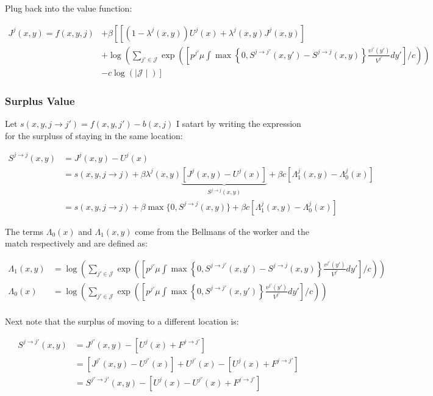 \documentclass[
  letterpaper,
  DIV=11,
  numbers=noendperiod]{scrartcl}
\begin{document}
Plug back into the value function:

\begin{align*}
J^j(x,y) = f(x,y,j) & + \beta\left [ \left[  (1-\lambda^j(x,y))U^{j}(x)   +\lambda^j(x,y)J^j(x,y) \right] \right. \\ & \left. +\log\left(\sum_{j'\in \mathcal{J}}\exp{\left(\left[p^{j'} \mu \int \max\left\{0, S^{j\to j' }(x,y')-S^{j \to j}(x,y) \right\}\frac{v^{ j' }(y')}{V^{j'}}dy' \right] / c\right)} \right) \right. \\ & \left.- c \log(\mid\mathcal{J}\mid)\right]
\end{align*}

\hypertarget{surplus-value}{%
\subsubsection{Surplus Value}\label{surplus-value}}

Let \(s(x,y, j \to j') = f(x,y,j') - b(x,j)\) I satart by writing the
expression for the surpluss of staying in the same location:

\begin{align*}
S^{j \to j}(x,y) &= J^j(x, y) - U^{j}(x) \\
& = s(x,y,j \to j) + \beta \lambda^j(x,y)\underbrace{\left[J^j(x,y) - U^j(x)\right]}_{S^{j\to j}(x,y)} + \beta c \left[ \Lambda^j_1(x, y) - \Lambda^j_0(x)\right]\\
& = s(x,y,j \to j) + \beta \max\{0, S^{j\to j}(x,y)\} + \beta c \left[ \Lambda^j_1(x, y) - \Lambda^j_0(x)\right]
\end{align*}

The terms \(\Lambda_0(x)\) and \(\Lambda_1(x,y)\) come from the Bellmans
of the worker and the match respectively and are defined as:

\begin{align*}
\Lambda_1(x, y) &= \log \left(\sum_{j'\in \mathcal{J}}\exp{\left(\left[p^{j'} \mu \int \max\left\{0, S^{j\to j' }(x,y')-S^{j \to j}(x,y) \right\}\frac{v^{ j' }(y')}{V^{j'}}dy' \right] / c\right)} \right) \\
\Lambda_0(x) &= \log \left(\sum_{j'\in \mathcal{J}}\exp{\left(\left[p^{j'} \mu \int \max\left\{0, S^{j\to j' }(x,y') \right\}\frac{v^{ j' }(y')}{V^{j'}}dy' \right] / c\right)}\right) \\
\end{align*}

Next note that the surplus of moving to a different location is:

\begin{align*}
S^{j \to j'}(x,y) &= J^{j'}(x, y) - \left[U^{j}(x) + F^{j \to j'}\right] \\
& = [J^{j'}(x, y) - U^{j'}(x)] + U^{j'}(x) - \left[U^{j}(x) + F^{j \to j'}\right] \\
& = S^{j'\to j'}(x,y) - [U^{j}(x) - U^{j'}(x) + F^{j \to j'}]
\end{align*}
\end{document}
